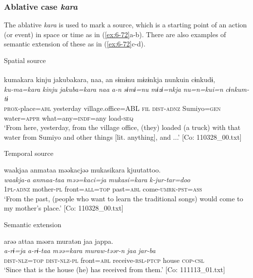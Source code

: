 \subsubsection{ Ablative case \textit{kara}}

The ablative \textit{kara} is used to mark a source, which is a starting point of an action (or event) in space or time as in (\ref{ex:6-72}a-b). There are also examples of semantic extension of these as in (\ref{ex:6-72}c-d).

\ea\label{ex:6-72}
 Spatial source\\

 \ea{}\\
{\TM}
\glll  kumakara  kinju  jakubakara,  naa,  an   sɨmɨnu  mɨzɨnkja  nunkuin  cɨnkudɨ,\\
\textit{ku-ma=kara}  \textit{kinju}  \textit{jakuba=kara}  \textit{naa}  \textit{a-n}   \textit{sɨmɨ=nu}  \textit{mɨzɨ=nkja}  \textit{nu=n=kui=n}  \textit{cɨnkum-tɨ}\\
\textsc{prox}-place=\textsc{abl}  yesterday  village.office=ABL  \textsc{fil}  \textsc{dist}-\textsc{adnz} Sumiyo=\textsc{gen}  water=\textsc{appr}  what=any=\textsc{indf}=any  load-\textsc{seq}\\
\glt ‘From here, yesterday, from the village office, (they) loaded (a truck) with that water from Sumiyo and other things [lit. anything], and ...’ [Co: 110328\_00.txt]
\z

  Temporal source

\ex {\TM}  waakjaa  anmataa  məəkacjəə  mukasikara kjuutattoo.\\
\glll \textit{waakja-a}  \textit{anmaa-taa}  \textit{məə=kaci=ja}  \textit{mukasi=kara}  \textit{k-jur-tar=doo}\\
1\textsc{pl}-\textsc{adnz}  mother-\textsc{pl}  front=\textsc{all}=\textsc{top}  past=\textsc{abl}  come-\textsc{umrk}-\textsc{pst}=\textsc{ass}\\
\glt ‘From the past, (people who want to learn the traditional songs) would come to my mother’s place.’ [Co: 110328\_00.txt]
\z

  Semantic extension

\ex {\TM}  arəə  attaa  məəra  muratən  jaa    jappa.\\
\glll \textit{a-rɨ=ja}  \textit{a-rɨ-taa}  \textit{məə=kara}  \textit{muraw-təər-n}  \textit{jaa}    \textit{jar-ba}\\
\textsc{dist}-\textsc{nlz}=\textsc{top}  \textsc{dist}-\textsc{nlz}-\textsc{pl}  front=\textsc{abl}  receive-\textsc{rsl}-\textsc{ptcp}  house \textsc{cop}-\textsc{csl}\\
\glt ‘Since that is the house (he) has received from them.’ [Co: 111113\_01.txt]
\z

